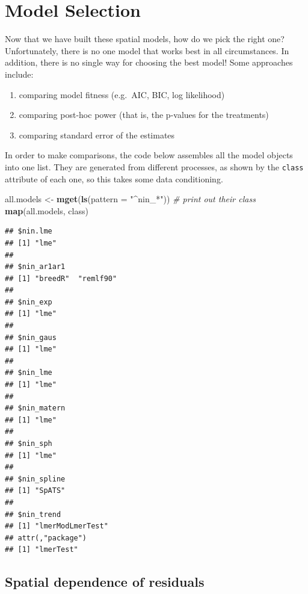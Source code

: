 \documentclass[
]{book}
\newenvironment{Shaded}{\begin{snugshade}}{\end{snugshade}}
\newcommand{\AttributeTok}[1]{\textcolor[rgb]{0.13,0.29,0.53}{#1}}
\newcommand{\CommentTok}[1]{\textcolor[rgb]{0.56,0.35,0.01}{\textit{#1}}}
\newcommand{\FunctionTok}[1]{\textcolor[rgb]{0.13,0.29,0.53}{\textbf{#1}}}
\newcommand{\NormalTok}[1]{#1}
\newcommand{\OtherTok}[1]{\textcolor[rgb]{0.56,0.35,0.01}{#1}}
\newcommand{\StringTok}[1]{\textcolor[rgb]{0.31,0.60,0.02}{#1}}
\providecommand{\tightlist}{%
  \setlength{\itemsep}{0pt}\setlength{\parskip}{0pt}}
\begin{document}
\hypertarget{model-selection}{%
\section{Model Selection}\label{model-selection}}

Now that we have built these spatial models, how do we pick the right one? Unfortunately, there is no one model that works best in all circumstances. In addition, there is no single way for choosing the best model! Some approaches include:

\begin{enumerate}
\def\labelenumi{\arabic{enumi}.}
\tightlist
\item
  comparing model fitness (e.g.~AIC, BIC, log likelihood)
\item
  comparing post-hoc power (that is, the p-values for the treatments)
\item
  comparing standard error of the estimates
\end{enumerate}

In order to make comparisons, the code below assembles all the model objects into one list. They are generated from different processes, as shown by the \texttt{class} attribute of each one, so this takes some data conditioning.

\begin{Shaded}
\begin{Highlighting}[]
\NormalTok{all.models }\OtherTok{\textless{}{-}} \FunctionTok{mget}\NormalTok{(}\FunctionTok{ls}\NormalTok{(}\AttributeTok{pattern =} \StringTok{"\^{}nin\_*"}\NormalTok{))}
\CommentTok{\# print out their class}
\FunctionTok{map}\NormalTok{(all.models, class)}
\end{Highlighting}
\end{Shaded}

\begin{verbatim}
## $nin.lme
## [1] "lme"
## 
## $nin_ar1ar1
## [1] "breedR"  "remlf90"
## 
## $nin_exp
## [1] "lme"
## 
## $nin_gaus
## [1] "lme"
## 
## $nin_lme
## [1] "lme"
## 
## $nin_matern
## [1] "lme"
## 
## $nin_sph
## [1] "lme"
## 
## $nin_spline
## [1] "SpATS"
## 
## $nin_trend
## [1] "lmerModLmerTest"
## attr(,"package")
## [1] "lmerTest"
\end{verbatim}

\hypertarget{spatial-dependence-of-residuals}{%
\subsection{Spatial dependence of residuals}\label{spatial-dependence-of-residuals}}
\end{document}
